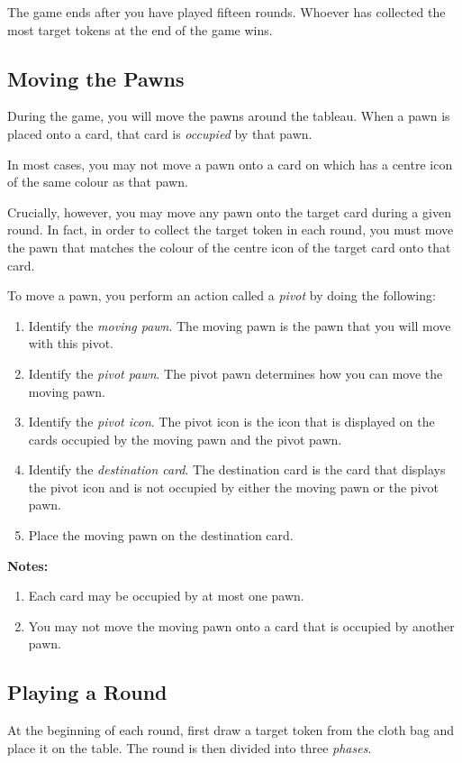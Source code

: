 \documentclass[a6paper, parskip=half, DIV=14, 10pt]{scrartcl}
\begin{document}
The game ends after you have played fifteen rounds. Whoever has collected the most target tokens at the end of the game wins.

\subsection*{Moving the Pawns}
During the game, you will move the pawns around the tableau. When a pawn is placed onto a card, that card is \emph{occupied} by that pawn.

In most cases, you may not move a pawn onto a card on which has a centre icon of the same colour as that pawn.

Crucially, however, you may move any pawn onto the target card during a given round. In fact, in order to collect the target token in each round, you must move the pawn that matches the colour of the centre icon of the target card onto that card.

\newpage

To move a pawn, you perform an action called a \emph{pivot} by doing the following:
\begin{enumerate}[leftmargin=*]
  \item Identify the \emph{moving pawn}. The moving pawn is the pawn that you will move with this pivot.
  \item Identify the \emph{pivot pawn}. The pivot pawn determines how you can move the moving pawn.
  \item Identify the \emph{pivot icon}. The pivot icon is the icon that is displayed on the cards occupied by the moving pawn and the pivot pawn.
  \item Identify the \emph{destination card}. The destination card is the card that displays the pivot icon and is not occupied by either the moving pawn or the pivot pawn.
  \item Place the moving pawn on the destination card.
\end{enumerate}

\textbf{Notes:}
\begin{enumerate}[leftmargin=*]
  \item Each card may be occupied by at most one pawn.
  \item You may not move the moving pawn onto a card that is occupied by another pawn.
\end{enumerate}

\newpage

\subsection*{Playing a Round}
At the beginning of each round, first draw a target token from the cloth bag and place it on the table. The round is then divided into three \emph{phases}.
\end{document}
